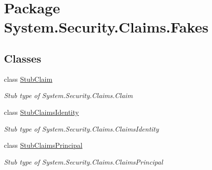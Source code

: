 \hypertarget{namespace_system_1_1_security_1_1_claims_1_1_fakes}{\section{Package System.\-Security.\-Claims.\-Fakes}
\label{namespace_system_1_1_security_1_1_claims_1_1_fakes}
}
\subsection*{Classes}
\begin{DoxyCompactItemize}
\item 
class \hyperlink{class_system_1_1_security_1_1_claims_1_1_fakes_1_1_stub_claim}{Stub\-Claim}
\begin{DoxyCompactList}\small\item\em Stub type of System.\-Security.\-Claims.\-Claim\end{DoxyCompactList}\item 
class \hyperlink{class_system_1_1_security_1_1_claims_1_1_fakes_1_1_stub_claims_identity}{Stub\-Claims\-Identity}
\begin{DoxyCompactList}\small\item\em Stub type of System.\-Security.\-Claims.\-Claims\-Identity\end{DoxyCompactList}\item 
class \hyperlink{class_system_1_1_security_1_1_claims_1_1_fakes_1_1_stub_claims_principal}{Stub\-Claims\-Principal}
\begin{DoxyCompactList}\small\item\em Stub type of System.\-Security.\-Claims.\-Claims\-Principal\end{DoxyCompactList}\end{DoxyCompactItemize}
